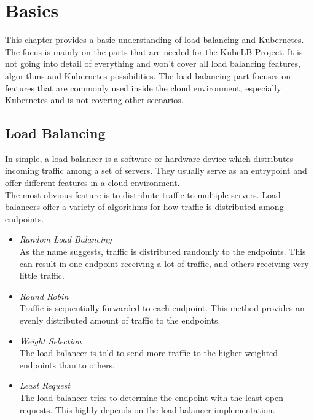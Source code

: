\chapter{Basics}\label{basics}

This chapter provides a basic understanding of load balancing and Kubernetes.
The focus is mainly on the parts that are needed for the KubeLB Project.
It is not going into detail of everything and won't cover all load balancing features, algorithms and Kubernetes possibilities.
The load balancing part focuses on features that are commonly used inside the cloud environment, especially Kubernetes and is not covering other scenarios.

\section{Load Balancing}

In simple, a load balancer is a software or hardware device which distributes incoming traffic among a set of servers.
They usually serve as an entrypoint and offer different features in a cloud environment.
\\
The most obvious feature is to distribute traffic to multiple servers.
Load balancers offer a variety of algorithms for how traffic is distributed among endpoints.~\cite{ALLEN-LOAD-BALANCING}

\begin{itemize}
    \item \textit{Random Load Balancing} \\
    As the name suggests, traffic is distributed randomly to the endpoints.
    This can result in one endpoint receiving a lot of traffic, and others receiving very little traffic.
    \item \textit{Round Robin} \\
    Traffic is sequentially forwarded to each endpoint.
    This method provides an evenly distributed amount of traffic to the endpoints.
    \item \textit{Weight Selection} \\
    The load balancer is told to send more traffic to the higher weighted endpoints than to others.
    \item \textit{Least Request} \\
    The load balancer tries to determine the endpoint with the least open requests.
    This highly depends on the load balancer implementation.
\end{itemize}

